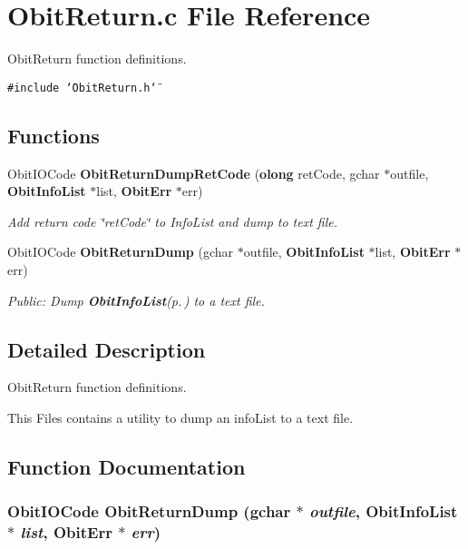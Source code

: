 \section{Obit\-Return.c File Reference}
\label{ObitReturn_8c}
Obit\-Return function definitions. 

{\tt \#include \char`\"{}Obit\-Return.h\char`\"{}}\par
\subsection*{Functions}
\begin{CompactItemize}
\item 
Obit\-IOCode {\bf Obit\-Return\-Dump\-Ret\-Code} ({\bf olong} ret\-Code, gchar $\ast$outfile, {\bf Obit\-Info\-List} $\ast$list, {\bf Obit\-Err} $\ast$err)
\begin{CompactList}\small\item\em Add return code \char`\"{}ret\-Code\char`\"{} to Info\-List and dump to text file. \item\end{CompactList}\item 
Obit\-IOCode {\bf Obit\-Return\-Dump} (gchar $\ast$outfile, {\bf Obit\-Info\-List} $\ast$list, {\bf Obit\-Err} $\ast$err)
\begin{CompactList}\small\item\em Public: Dump {\bf Obit\-Info\-List}{\rm (p.\,\pageref{structObitInfoList})} to a text file. \item\end{CompactList}\end{CompactItemize}


\subsection{Detailed Description}
Obit\-Return function definitions. 

This Files contains a utility to dump an info\-List to a text file.

\subsection{Function Documentation}
\subsubsection{\setlength{\rightskip}{0pt plus 5cm}Obit\-IOCode Obit\-Return\-Dump (gchar $\ast$ {\em outfile}, {\bf Obit\-Info\-List} $\ast$ {\em list}, {\bf Obit\-Err} $\ast$ {\em err})}\label{ObitReturn_8c_a2}


